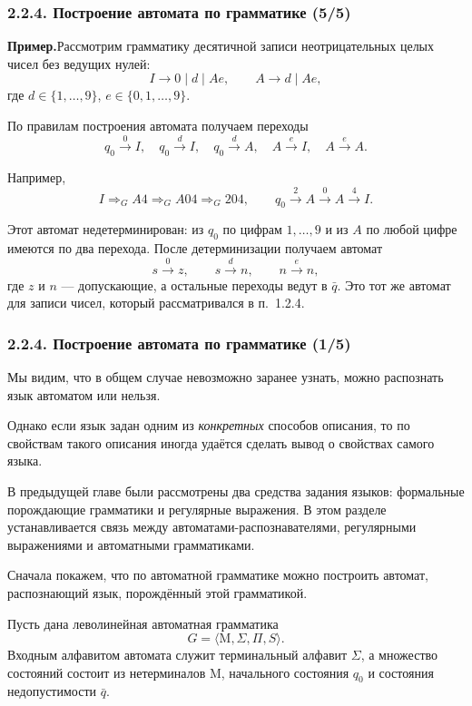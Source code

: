 \documentclass[mathserif,12pt,aspectratio=169]{beamer}
\def\emразделенной{\em разделенной}
\def\em#1{\it\color{blue}#1}
\def\example{\par{\bf \color{brown} Пример.}}
\begin{document}
\begin{frame}
\frametitle{2.2.4. Построение автомата по грамматике (5/5)}
\small
\example Рассмотрим грамматику десятичной записи неотрицательных целых чисел
без ведущих нулей:
\[
I\to 0 \mid d \mid Ae,
\qquad
A\to d \mid Ae,
\]
где \(d\in\{1,\dots,9\}\), \(e\in\{0,1,\dots,9\}\).

По правилам построения автомата получаем переходы
\[
q_0\xrightarrow{0}I,
\quad
q_0\xrightarrow{d}I,
\quad
q_0\xrightarrow{d}A,
\quad
A\xrightarrow{e}I,
\quad
A\xrightarrow{e}A.
\]

Например,
\[
I\Rightarrow_G A4\Rightarrow_G A04\Rightarrow_G 204,
\qquad
q_0\xrightarrow{2}A\xrightarrow{0}A\xrightarrow{4}I.
\]

Этот автомат недетерминирован: из \(q_0\) по цифрам \(1,\dots,9\) и из \(A\)
по любой цифре имеются по два перехода.
После детерминизации получаем автомат
\[
s\xrightarrow{0}z,
\qquad
s\xrightarrow{d}n,
\qquad
n\xrightarrow{e}n,
\]
где \(z\) и \(n\) --- допускающие, а остальные переходы ведут в \(\bar q\).
Это тот же автомат для записи чисел, который рассматривался в п.~1.2.4.

\end{frame}


\begin{frame}
\frametitle{2.2.4. Построение автомата по грамматике (1/5)}

Мы видим, что в общем случае невозможно заранее узнать,
можно распознать язык автоматом или нельзя.

\smallskip
Однако если язык задан одним из {\em конкретных} способов описания,
то по свойствам такого описания иногда удаётся сделать вывод
о свойствах самого языка.

\smallskip
В предыдущей главе были рассмотрены два средства задания языков:
формальные порождающие грамматики и регулярные выражения.
В этом разделе устанавливается связь между автоматами-распознавателями,
регулярными выражениями и автоматными грамматиками.

\smallskip
Сначала покажем, что по автоматной грамматике можно построить
автомат, распознающий язык, порождённый этой грамматикой.

\smallskip
Пусть дана леволинейная автоматная грамматика
\[
G=\langle \mathrm{M},\Sigma,\Pi,S\rangle.
\]
Входным алфавитом автомата служит терминальный алфавит \(\Sigma\),
а множество состояний состоит из нетерминалов \(\mathrm{M}\),
начального состояния \(q_0\) и состояния недопустимости \(\bar q\).

\end{frame}
\end{document}
